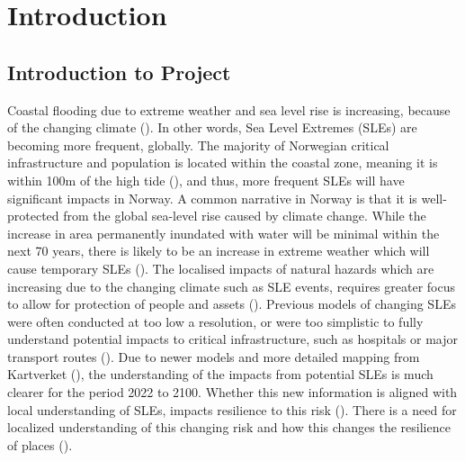 




\chapter{Introduction}
\section{Introduction to Project}
Coastal flooding due to extreme weather and sea level rise is increasing, because of the changing climate (\cite{hoffken_effects_2020}).  In other words, Sea Level Extremes (SLEs) are becoming more frequent, globally. The majority of Norwegian critical infrastructure and population is located within the coastal zone, meaning it is within 100m of the high tide (\cite{engebakken_construction_2022}), and thus, more frequent SLEs will have significant impacts in Norway. A common narrative in Norway is that it is well-protected from the global sea-level rise caused by climate change. While the increase in area permanently inundated with water will be minimal within the next 70 years, there is likely to be an increase in extreme weather which will cause temporary SLEs (\cite{aunan_strong_2008}). The localised impacts of natural hazards which are increasing due to the changing climate such as SLE events, requires greater focus to allow for protection of people and assets (\cite{lujala_quantifying_2014}). Previous models of changing SLEs were often conducted at too low a resolution, or were too simplistic to fully understand potential impacts to critical infrastructure, such as hospitals or major transport routes (\cite{hoffken_effects_2020}). Due to newer models and more detailed mapping from Kartverket (\cite{kartverket_se_2021}), the understanding of the impacts from potential SLEs is much clearer for the period 2022 to 2100. Whether this new information is aligned with local understanding of SLEs, impacts resilience to this risk (\cite{setten_we_2019}).  There is a need for localized understanding of this changing risk and how this changes the resilience of places (\cite{rod_integrated_2012}).
